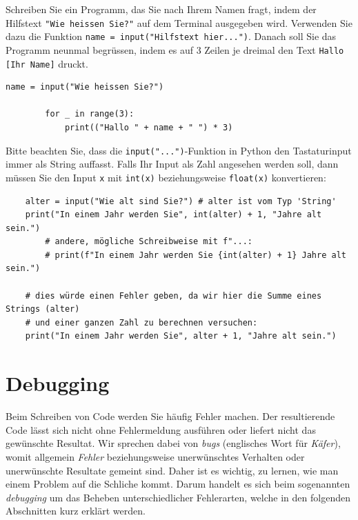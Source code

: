 \begin{myexercise}\label{ex:name}
	Schreiben Sie ein Programm, das Sie nach Ihrem Namen fragt, indem der Hilfstext \lstinline|"Wie heissen Sie?"| auf dem Terminal ausgegeben wird. Verwenden Sie dazu die Funktion \lstinline|name = input("Hilfstext hier...")|. Danach soll Sie das Programm neunmal begrüssen, indem es auf 3 Zeilen je dreimal den Text \texttt{Hallo [Ihr Name]} druckt.
	\begin{myanswer}
		\begin{lstlisting}[numbers=none]
		name = input("Wie heissen Sie?")

		for _ in range(3):
			print(("Hallo " + name + " ") * 3)
	  \end{lstlisting}
	\end{myanswer}
\end{myexercise}


\begin{myremark}\label{myremark:input_takes_string}
	Bitte beachten Sie, dass die \lstinline{input("...")}-Funktion in Python den Tastaturinput immer als String auffasst. Falls Ihr Input als Zahl angesehen werden soll, dann müssen Sie den Input \lstinline|x| mit \lstinline|int(x)| beziehungsweise \lstinline|float(x)| konvertieren:
	\begin{lstlisting}
	alter = input("Wie alt sind Sie?") # alter ist vom Typ 'String'
	print("In einem Jahr werden Sie", int(alter) + 1, "Jahre alt sein.")
		# andere, mögliche Schreibweise mit f"...:
		# print(f"In einem Jahr werden Sie {int(alter) + 1} Jahre alt sein.")

	# dies würde einen Fehler geben, da wir hier die Summe eines Strings (alter)
	# und einer ganzen Zahl zu berechnen versuchen:
	print("In einem Jahr werden Sie", alter + 1, "Jahre alt sein.")
	\end{lstlisting}
\end{myremark}


\section{Debugging}
Beim Schreiben von Code werden Sie häufig Fehler machen. Der resultierende Code lässt sich nicht ohne Fehlermeldung ausführen oder liefert nicht das gewünschte Resultat. Wir sprechen dabei von \emph{bugs} (englisches Wort für \emph{Käfer}), womit allgemein \emph{Fehler} beziehungsweise unerwünschtes Verhalten oder unerwünschte Resultate gemeint sind. Daher ist es wichtig, zu lernen, wie man einem Problem auf die Schliche kommt. Darum handelt es sich beim sogenannten \emph{debugging} um das Beheben unterschiedlicher Fehlerarten, welche in den folgenden Abschnitten kurz erklärt werden.

